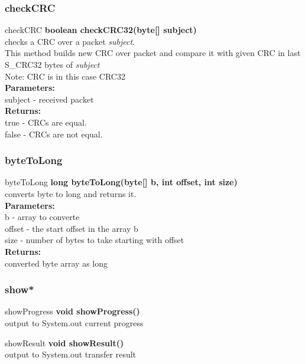 \documentclass[12pt]{article}
\begin{document}
\subsubsection{checkCRC}
\begin{mybox}[colback=white]{checkCRC}
\textbf{boolean checkCRC32(byte[] subject)} \\
checks a CRC over a packet \textit{subject}. \\
This method builds new CRC over packet and compare it with given
CRC in last S\_CRC32 bytes of \textit{subject}
\\
Note: CRC is in this case CRC32  \\
\textbf{Parameters:} \\
subject - received packet\\
\textbf{Returns:} \\
true - CRCs are equal. \\
false - CRCs are not equal.
\end{mybox}

\subsubsection{byteToLong}
\begin{mybox}[colback=white]{byteToLong}
\textbf{long byteToLong(byte[] b, int offset, int size)} \\
converts byte to long and returns it.
\\
\textbf{Parameters:} \\
b - array to converte\\
offset - the start offset in the array b\\
size - number of bytes to take starting with offset\\
\textbf{Returns:} \\
converted byte array as long
\end{mybox}


\subsubsection{show*}
\begin{mybox}[colback=white]{showProgress}
\textbf{void showProgress()} \\
output to System.out current progress 
\end{mybox}

\begin{mybox}[colback=white]{showResult}
\textbf{void showResult()} \\
output to System.out transfer result 
\end{mybox}
\end{document}
